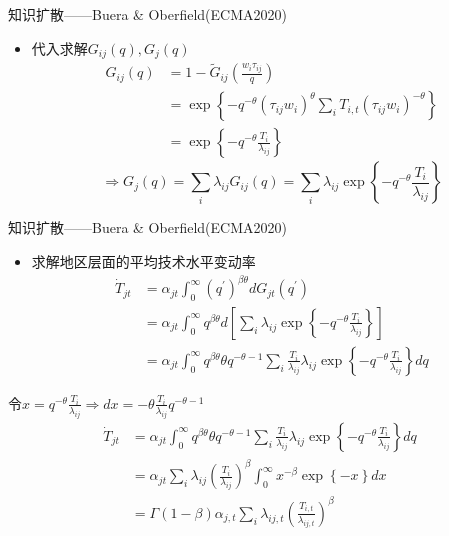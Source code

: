 \documentclass{beamer}
\begin{document}
\begin{frame}{知识扩散——Buera \& Oberfield(ECMA2020)}
\begin{itemize}
    \item 代入求解\(G_{ij}(q),G_j(q)\)
\begin{align*}
    G_{ij}(q)&=1-\tilde{G}_{ij}(\frac{w_{i}\tau_{ij}}{q})\\&=\exp\left\{ -q^{-\theta}\left(\tau_{ij}w_{i}\right)^{\theta}\sum_{i}T_{i,t}\left(\tau_{ij}w_{i}\right)^{-\theta}\right\} \\&=\exp\left\{ -q^{-\theta}\frac{T_{i}}{\lambda_{ij}}\right\} 
\end{align*}
\[\Longrightarrow G_{j}(q)=\sum_{i}\lambda_{ij}G_{ij}(q)=\sum_{i}\lambda_{ij}\exp\left\{ -q^{-\theta}\frac{T_{i}}{\lambda_{ij}}\right\} \]
\end{itemize}
\end{frame}

\begin{frame}{知识扩散——Buera \& Oberfield(ECMA2020)}
\begin{itemize}
    \item 求解地区层面的平均技术水平变动率
    \footnotesize
\begin{align*}
\dot{T}_{jt}&=\alpha_{jt}\int_{0}^{\infty}\left(q^{\prime}\right)^{\beta\theta}dG_{jt}(q^{\prime})\\&=\alpha_{jt}\int_{0}^{\infty}q^{\beta\theta}d\left[\sum_{i}\lambda_{ij}\exp\left\{ -q^{-\theta}\frac{T_{i}}{\lambda_{ij}}\right\} \right]\\&=\alpha_{jt}\int_{0}^{\infty}q^{\beta\theta}\theta q^{-\theta-1}\sum_{i}\frac{T_{i}}{\lambda_{ij}}\lambda_{ij}\exp\left\{ -q^{-\theta}\frac{T_{i}}{\lambda_{ij}}\right\} dq
\end{align*}
\end{itemize}
\footnotesize
令\(x=q^{-\theta}\frac{T_{i}}{\lambda_{ij}}\Longrightarrow dx=-\theta\frac{T_{i}}{\lambda_{ij}}q^{-\theta-1}\)
\begin{align*}
    \dot{T}_{jt}&=\alpha_{jt}\int_{0}^{\infty}q^{\beta\theta}\theta q^{-\theta-1}\sum_{i}\frac{T_{i}}{\lambda_{ij}}\lambda_{ij}\exp\left\{ -q^{-\theta}\frac{T_{i}}{\lambda_{ij}}\right\} dq\\&=\alpha_{jt}\sum_{i}\lambda_{ij}\left(\frac{T_{i}}{\lambda_{ij}}\right)^{\beta}\int_{0}^{\infty}x^{-\beta}\exp\left\{ -x\right\} dx\\&=\Gamma\left(1-\beta\right)\alpha_{j,t}\sum_{i}\lambda_{ij,t}\left(\frac{T_{i,t}}{\lambda_{ij,t}}\right)^{\beta}
\end{align*}
\end{frame}
\end{document}
